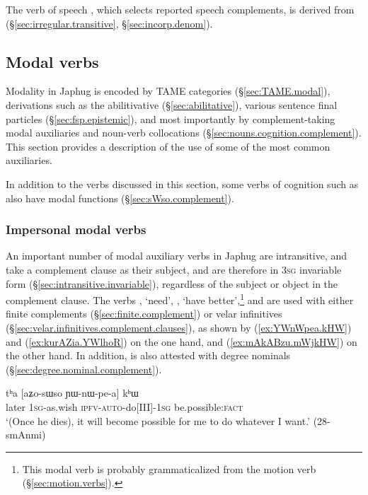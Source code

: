 The verb of speech , which selects reported speech complements, is derived from  (§\ref{sec:irregular.transitive}, §\ref{sec:incorp.denom}).

 \subsection{Modal verbs}
Modality in Japhug is encoded by TAME categories (§\ref{sec:TAME.modal}), derivations such as the abilitivative (§\ref{sec:abilitative}), various sentence final particles (§\ref{sec:fsp.epistemic}), and most importantly by com\-ple\-ment-taking modal auxiliaries and noun-verb collocations (§\ref{sec:nouns.cognition.complement}). This section provides a description of the use of some of the most common auxiliaries. 
  
In addition to the verbs discussed in this section, some verbs of cognition such as   also have modal functions (§\ref{sec:sWso.complement}).


 \subsubsection{Impersonal modal verbs} \label{sec:ra.khW.jAG.verb}
An important number of modal auxiliary verbs in Japhug are intransitive, and take a complement clause as their subject, and are therefore in \textsc{3sg} invariable form (§\ref{sec:intransitive.invariable}), regardless of the subject or object in the complement clause. The verbs , `need', , `have better',\footnote{This modal verb is probably grammaticalized from the motion verb (§\ref{sec:motion.verbs}).} and  are used with either finite complements (§\ref{sec:finite.complement}) or velar infinitives (§\ref{sec:velar.infinitives.complement.clauses}), as shown by (\ref{ex:YWnWpea.kHW}) and (\ref{ex:kurAZia.YWlhoR}) on the one hand, and (\ref{ex:mAkABzu.mWjkHW}) on the other hand. In addition,  is also attested with degree nominals (§\ref{sec:degree.nominal.complement}).

\begin{exe} 
\ex \label{ex:YWnWpea.kHW}
\gll tʰa [aʑo-sɯso ɲɯ-nɯ-pe-a] kʰɯ \\
later \textsc{1sg}-as.wish \textsc{ipfv}-\textsc{auto}-do[III]-\textsc{1sg} be.possible:\textsc{fact} \\
\glt `(Once he dies), it will become possible for me to do whatever I want.' (28-smAnmi)
\end{exe} 

